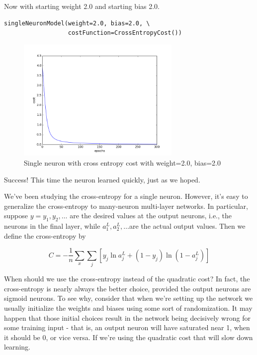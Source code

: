 \documentclass[12 pt]{article}
\begin{document}
Now with starting weight 2.0 and starting bias 2.0.

\begin{verbatim}
singleNeuronModel(weight=2.0, bias=2.0, \
                  costFunction=CrossEntropyCost())
\end{verbatim}

\begin{figure}[htp]
\centering
\includegraphics[width=0.7\textwidth]{./figs/single_neuron4_cross_entropy_cost.png}
\caption{Single neuron with cross entropy cost with weight=2.0, bias=2.0}
\end{figure}

Success! This time the neuron learned quickly, just as we hoped.

We've been studying the cross-entropy for a single neuron. However, it's
easy to generalize the cross-entropy to many-neuron multi-layer
networks. In particular, suppose $ y = y_1, y_2, \ldots{} $ are the
desired values at the output neurons, i.e., the neurons in the final
layer, while $ a^L_1, a^L_2, \ldots{} $are the actual output
values. Then we define the cross-entropy by

\begin{equation}
        C = -\frac{1}{n} \sum_x \sum_j \left[ y_j \ln a^L_j +
        (1 - y_j) \ln (1 - a^L_j) \right ]
\end{equation}

When should we use the cross-entropy instead of the quadratic cost? In
fact, the cross-entropy is nearly always the better choice, provided the
output neurons are sigmoid neurons. To see why, consider that when we're
setting up the network we usually initialize the weights and biases
using some sort of randomization. It may happen that those initial
choices result in the network being decisively wrong for some training
input - that is, an output neuron will have saturated near 1, when it
should be 0, or vice versa. If we're using the quadratic cost that will
slow down learning.
\end{document}
